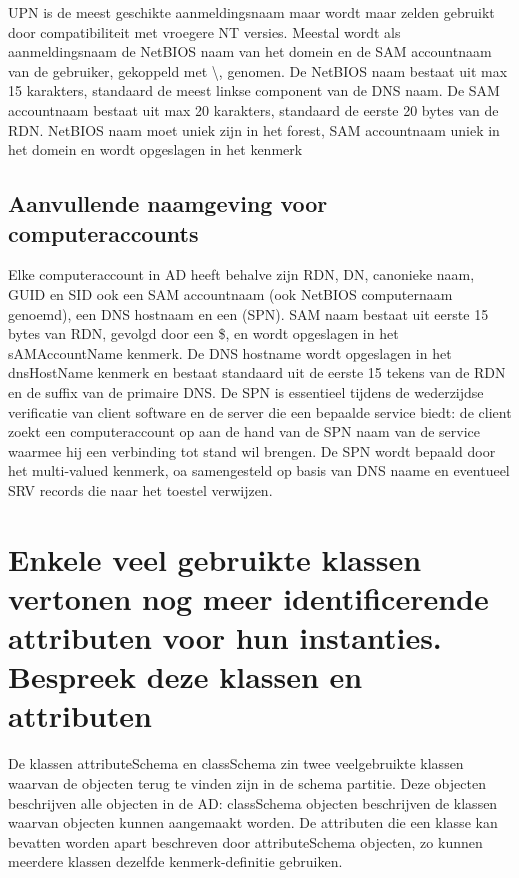 UPN is de meest geschikte aanmeldingsnaam maar wordt maar zelden gebruikt door
compatibiliteit met vroegere NT versies. Meestal wordt als aanmeldingsnaam de
NetBIOS naam van het domein en de SAM accountnaam van de gebruiker, gekoppeld
met \textbackslash, genomen. De NetBIOS naam bestaat uit max 15 karakters, standaard de meest
linkse component van de DNS naam. De SAM accountnaam bestaat uit max 20
karakters, standaard de eerste 20 bytes van de RDN. NetBIOS naam moet uniek zijn
in het forest, SAM accountnaam uniek in het domein en wordt opgeslagen in het
 kenmerk

\subsection{Aanvullende naamgeving voor computeraccounts}

Elke computeraccount in AD heeft behalve zijn RDN, DN, canonieke naam, GUID en
SID ook een SAM accountnaam (ook NetBIOS computernaam genoemd), een DNS hostnaam
en een  (SPN).
SAM naam bestaat uit eerste 15 bytes van RDN, gevolgd door een \$, en wordt
opgeslagen in het sAMAccountName kenmerk.
De DNS hostname wordt opgeslagen in het dnsHostName kenmerk en bestaat
standaard uit de eerste 15 tekens van de RDN en de suffix van de primaire DNS.
De SPN is essentieel tijdens de wederzijdse verificatie van client software en
de server die een bepaalde service biedt: de client zoekt een computeraccount op
aan de hand van de SPN naam van de service waarmee hij een verbinding tot stand
wil brengen. De SPN wordt bepaald door het multi-valued
 kenmerk, oa samengesteld op basis van DNS naame en
eventueel SRV records die naar het toestel verwijzen.

\section{Enkele veel gebruikte klassen vertonen nog meer identificerende
attributen voor hun instanties. Bespreek deze klassen en attributen}

De klassen attributeSchema en classSchema zin twee veelgebruikte klassen waarvan
de objecten terug te vinden zijn in de schema partitie. Deze objecten
beschrijven alle objecten in de AD: classSchema objecten beschrijven de klassen
waarvan objecten kunnen aangemaakt worden. De attributen die een klasse kan
bevatten worden apart beschreven door attributeSchema objecten, zo kunnen
meerdere klassen dezelfde kenmerk-definitie gebruiken.

